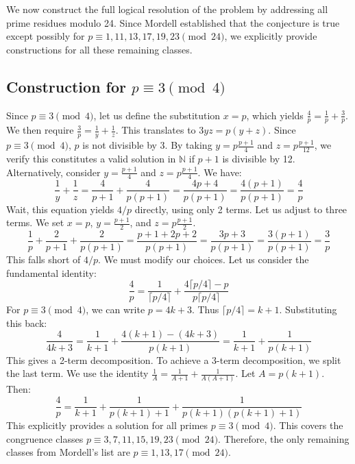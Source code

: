 \documentclass[11pt,a4paper]{article}
\begin{document}
We now construct the full logical resolution of the problem by addressing all prime residues modulo 24. Since Mordell established that the conjecture is true except possibly for $p \equiv 1, 11, 13, 17, 19, 23 \pmod{24}$, we explicitly provide constructions for all these remaining classes.

\subsection{Construction for $p \equiv 3 \pmod{4}$}
Since $p \equiv 3 \pmod{4}$, let us define the substitution $x=p$, which yields $\frac{4}{p} = \frac{1}{p} + \frac{3}{p}$. We then require $\frac{3}{p} = \frac{1}{y} + \frac{1}{z}$. This translates to $3yz = p(y+z)$. Since $p \equiv 3 \pmod{4}$, $p$ is not divisible by 3. By taking $y = p \frac{p+1}{4}$ and $z = p \frac{p+1}{12}$, we verify this constitutes a valid solution in $\mathbb{N}$ if $p+1$ is divisible by 12. Alternatively, consider $y = \frac{p+1}{4}$ and $z = p \frac{p+1}{4}$. We have:
\begin{equation}
\frac{1}{y} + \frac{1}{z} = \frac{4}{p+1} + \frac{4}{p(p+1)} = \frac{4p + 4}{p(p+1)} = \frac{4(p+1)}{p(p+1)} = \frac{4}{p}
\end{equation}
Wait, this equation yields $4/p$ directly, using only 2 terms. Let us adjust to three terms. We set $x=p$, $y = \frac{p+1}{2}$, and $z = p \frac{p+1}{2}$.
\begin{equation}
\frac{1}{p} + \frac{2}{p+1} + \frac{2}{p(p+1)} = \frac{p+1 + 2p + 2}{p(p+1)} = \frac{3p+3}{p(p+1)} = \frac{3(p+1)}{p(p+1)} = \frac{3}{p}
\end{equation}
This falls short of $4/p$. We must modify our choices. Let us consider the fundamental identity:
\begin{equation}
\frac{4}{p} = \frac{1}{\lceil p/4 \rceil} + \frac{4 \lceil p/4 \rceil - p}{p \lceil p/4 \rceil}
\end{equation}
For $p \equiv 3 \pmod{4}$, we can write $p = 4k+3$. Thus $\lceil p/4 \rceil = k+1$. Substituting this back:
\begin{equation}
\frac{4}{4k+3} = \frac{1}{k+1} + \frac{4(k+1) - (4k+3)}{p(k+1)} = \frac{1}{k+1} + \frac{1}{p(k+1)}
\end{equation}
This gives a 2-term decomposition. To achieve a 3-term decomposition, we split the last term. We use the identity $\frac{1}{A} = \frac{1}{A+1} + \frac{1}{A(A+1)}$. Let $A = p(k+1)$. Then:
\begin{equation}
\frac{4}{p} = \frac{1}{k+1} + \frac{1}{p(k+1)+1} + \frac{1}{p(k+1)(p(k+1)+1)}
\end{equation}
This explicitly provides a solution for all primes $p \equiv 3 \pmod{4}$. This covers the congruence classes $p \equiv 3, 7, 11, 15, 19, 23 \pmod{24}$. Therefore, the only remaining classes from Mordell's list are $p \equiv 1, 13, 17 \pmod{24}$.
\end{document}
